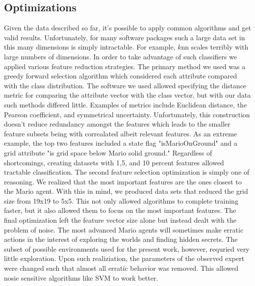 \documentclass[]{article}   %
\begin{document}
\subsection{Optimizations}
Given the data described so far, it's possible to apply common algorithms and get valid results.  Unfortunately, for many software packages such a large data set in this many dimensions is simply intractable.  For example, $k$nn scales terribly with large numbers of dimensions.  In order to take advantage of such classifiers we applied various feature reduction strategies.
\newline\newline
The primary method we used was a greedy forward selection algorithm which considered each attribute compared with the class distribution.  The software we used allowed specifying the distance metric for comparing the attribute vector with the class vector, but with our data such methods differed little.  Examples of metrics include Euclidean distance, the Pearson coefficient, and symmetrical uncertainty.  Unfortunately, this construction doesn't reduce redundancy amongst the features which leads to the smaller feature subsets being with correalated albeit relevant features.  As an extreme example, the top two features included a state flag "isMarioOnGround" and a grid attribute "is grid space below Mario solid ground."  Regardless of shortcomings, creating datasets with 1,5, and 10 percent features allowed tractable classification.
\newline\newline
The second feature selection optimization is simply one of reasoning.  We realized that the most important features are the ones closest to the Mario agent.  With this in mind, we produced data sets that reduced the grid size from 19x19 to 5x5.  This not only allowed algorithms to complete training faster, but it also allowed them to focus on the most important features.
\newline\newline
The final optimization left the feature vector size alone but instead dealt with the problem of noise.  The most advanced Mario agents will sometimes make erratic actions in the interest of exploring the worlds and finding hidden secrets.  The subset of possible environments used for the present work, however, requried very little exploration.  Upon such realiziation, the parameters of the observed expert were changed such that almost all erratic behavior was removed.  This allowed nosie sensitive algorithms like SVM to work better.
\end{document}
